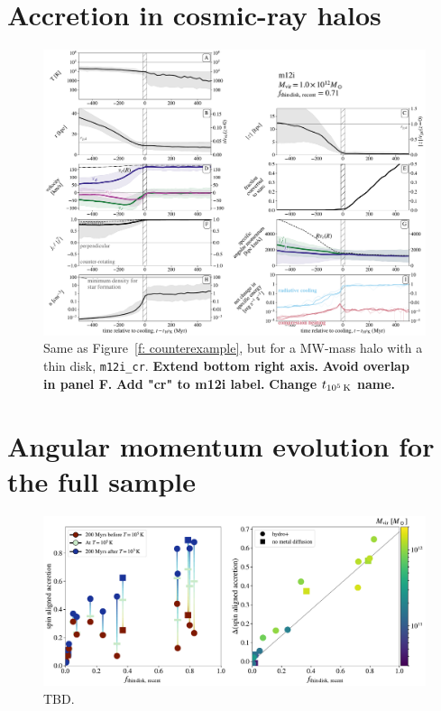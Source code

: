 \documentclass[fleqn,usenatbib]{mnras}
\newcommand{\tcon}{t_{10^5\,{\rm K}}}
\begin{document}
\section{Accretion in cosmic-ray halos}
\label{s: appendix-other m12s}

\begin{figure}
\includegraphics[width=\textwidth]{figures/before_and_after/before_and_after_allone_m12i_cr.pdf}
\caption{
Same as Figure~\ref{f: counterexample}, but for a MW-mass halo with a thin disk, \texttt{m12i\_cr}.
\textbf{Extend bottom right axis.}
\textbf{Avoid overlap in panel F.}
\textbf{Add "cr" to m12i label.}
\textbf{Change $\tcon$ name.}
}
\label{f: before and after m12i cr}
\end{figure}

\section{Angular momentum evolution for the full sample}
\label{s: appendix-angular momentum evolution}

\begin{figure}
    \centering
    \includegraphics[width=\textwidth]{figures/prevalence/aligned_fraction_ang_momentum.pdf}
    \caption{
    TBD.
    }
    \label{f: prevalence - angular momentume}
\end{figure}
\end{document}
